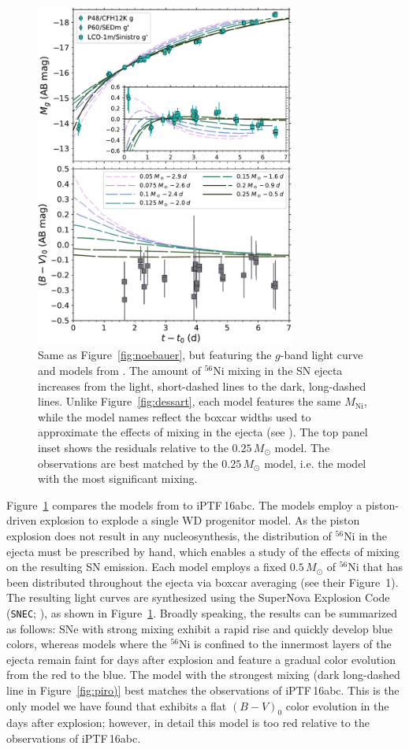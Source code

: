 \documentclass[twocolumn]{aastex61}
\newcommand{\sm}{M_\odot}
\newcommand{\abc}{iPTF\,16abc}
\begin{document}
\begin{figure}[]
  \centering
  \includegraphics[width=3.35in]{compare_Piro.pdf}
  \caption{
  Same as Figure~\ref{fig:noebauer}, but featuring the $g$-band light curve
  and models from \citet{2016ApJ...826...96P}. The amount of $^{56}$Ni
  mixing in the SN ejecta increases from the light, short-dashed lines to
  the dark, long-dashed lines. Unlike Figure~\ref{fig:dessart}, each model
  features the same $M_\mathrm{Ni}$, while the model names reflect the
  boxcar widths used to approximate the effects of mixing in the ejecta (see
  \citealt{2016ApJ...826...96P}). The top panel inset shows the residuals
  relative to the $0.25\,M_\odot$ model. The observations are best matched
  by the $0.25\,M_\odot$ model, i.e. the model with the most significant
  mixing.}
  \label{fig:piro}
\end{figure}

Figure~\ref{fig:piro} compares the models from \citet{2016ApJ...826...96P}
to \abc. The \citeauthor{2016ApJ...826...96P} models employ a piston-driven
explosion to explode a single WD progenitor model. As the piston explosion
does not result in any nucleosynthesis, the distribution of $^{56}$Ni in the
ejecta must be prescribed by hand, which enables a study of the effects of
mixing on the resulting SN emission. Each model employs a fixed $0.5\,\sm$
of $^{56}$Ni that has been distributed throughout the ejecta via boxcar
averaging (see their Figure~1). The resulting light curves are synthesized
using the SuperNova Explosion Code (\texttt{SNEC};
\citealt{2015ApJ...814...63M}), as shown in Figure~\ref{fig:piro}. Broadly
speaking, the results can be summarized as follows: SNe with strong mixing
exhibit a rapid rise and quickly develop blue colors, whereas models where
the $^{56}$Ni is confined to the innermost layers of the ejecta remain faint
for days after explosion and feature a gradual color evolution from the red
to the blue. The model with the strongest mixing (dark long-dashed line in
Figure~\ref{fig:piro)} best matches the observations of \abc. This is the
only model we have found that exhibits a flat $(B-V)_0$ color evolution in
the days after explosion; however, in detail this model is too red relative
to the observations of \abc.
\end{document}
